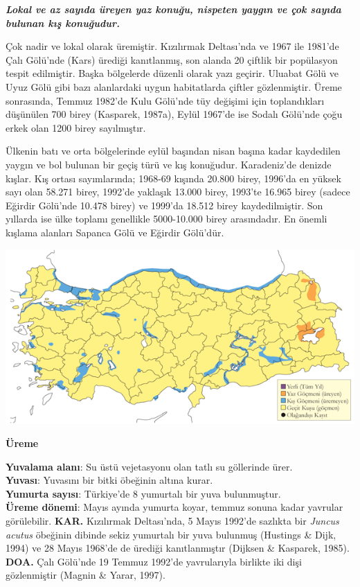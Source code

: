 \documentclass[
  a4paper,
  DIV=11,
  numbers=noendperiod]{scrreprt}
\begin{document}
\textbf{\emph{Lokal ve az sayıda üreyen yaz konuğu, nispeten yaygın ve
çok sayıda bulunan kış konuğudur.}}

Çok nadir ve lokal olarak üremiştir. Kızılırmak Deltası'nda ve 1967 ile
1981'de Çalı Gölü'nde (Kars) ürediği kanıtlanmış, son alanda 20 çiftlik
bir popülasyon tespit edilmiştir. Başka bölgelerde düzenli olarak yazı
geçirir. Uluabat Gölü ve Uyuz Gölü gibi bazı alanlardaki uygun
habitatlarda çiftler gözlenmiştir. Üreme sonrasında, Temmuz 1982'de Kulu
Gölü'nde tüy değişimi için toplandıkları düşünülen 700 birey (Kasparek,
1987a), Eylül 1967'de ise Sodalı Gölü'nde çoğu erkek olan 1200 birey
sayılmıştır.

Ülkenin batı ve orta bölgelerinde eylül başından nisan başına kadar
kaydedilen yaygın ve bol bulunan bir geçiş türü ve kış konuğudur.
Karadeniz'de denizde kışlar. Kış ortası sayımlarında; 1968-69 kışında
20.800 birey, 1996'da en yüksek sayı olan 58.271 birey, 1992'de yaklaşık
13.000 birey, 1993'te 16.965 birey (sadece Eğirdir Gölü'nde 10.478
birey) ve 1999'da 18.512 birey kaydedilmiştir. Son yıllarda ise ülke
toplamı genellikle 5000-10.000 birey arasındadır. En önemli kışlama
alanları Sapanca Gölü ve Eğirdir Gölü'dür.

\includegraphics{images/harita_Page_025.png}

\textbf{Üreme}

\textbf{Yuvalama alanı}: Su üstü vejetasyonu olan tatlı su göllerinde
ürer.\\
\textbf{Yuvası}: Yuvasını bir bitki öbeğinin altına kurar.\\
\textbf{Yumurta sayısı}: Türkiye'de 8 yumurtalı bir yuva bulunmuştur.\\
\textbf{Üreme dönemi}: Mayıs ayında yumurta koyar, temmuz sonuna kadar
yavrular görülebilir. \textbf{KAR.} Kızılırmak Deltası'nda, 5 Mayıs
1992'de sazlıkta bir \emph{Juncus acutus} öbeğinin dibinde sekiz
yumurtalı bir yuva bulunmuş (Hustings \& Dijk, 1994) ve 28 Mayıs 1968'de
de ürediği kanıtlanmıştır (Dijksen \& Kasparek, 1985). \textbf{DOA.}
Çalı Gölü'nde 19 Temmuz 1992'de yavrularıyla birlikte iki dişi
gözlenmiştir (Magnin \& Yarar, 1997).
\end{document}
